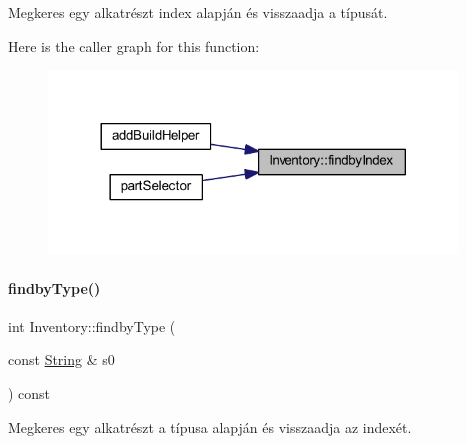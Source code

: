 Megkeres egy alkatrészt index alapján és visszaadja a típusát. 

Here is the caller graph for this function\+:
\nopagebreak
\begin{figure}[H]
\begin{center}
\leavevmode
\includegraphics[width=308pt]{class_inventory_acb0afe61bcfc92a963f803f1b70676dc_icgraph}
\end{center}
\end{figure}
\mbox{\label{class_inventory_a2a5998334229d148aac3e0dc16642480}} 
\paragraph{\texorpdfstring{findbyType()}{findbyType()}}
{\footnotesize\ttfamily int Inventory\+::findby\+Type (\begin{DoxyParamCaption}\item[{const \mbox{\hyperlink{class_string}{String}} \&}]{s0 }\end{DoxyParamCaption}) const}



Megkeres egy alkatrészt a típusa alapján és visszaadja az indexét. 

